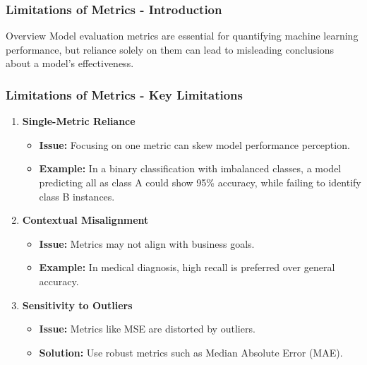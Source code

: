 \documentclass{beamer}
\begin{document}
\begin{frame}[fragile]
    \frametitle{Limitations of Metrics - Introduction}
    \begin{block}{Overview}
        Model evaluation metrics are essential for quantifying machine learning performance, but reliance solely on them can lead to misleading conclusions about a model's effectiveness.
    \end{block}
\end{frame}

\begin{frame}[fragile]
    \frametitle{Limitations of Metrics - Key Limitations}
    \begin{enumerate}
        \item \textbf{Single-Metric Reliance}
        \begin{itemize}
            \item \textbf{Issue:} Focusing on one metric can skew model performance perception.
            \item \textbf{Example:} In a binary classification with imbalanced classes, a model predicting all as class A could show 95\% accuracy, while failing to identify class B instances.
        \end{itemize}

        \item \textbf{Contextual Misalignment}
        \begin{itemize}
            \item \textbf{Issue:} Metrics may not align with business goals.
            \item \textbf{Example:} In medical diagnosis, high recall is preferred over general accuracy.
        \end{itemize}

        \item \textbf{Sensitivity to Outliers}
        \begin{itemize}
            \item \textbf{Issue:} Metrics like MSE are distorted by outliers.
            \item \textbf{Solution:} Use robust metrics such as Median Absolute Error (MAE).
        \end{itemize}
    \end{enumerate}
\end{frame}
\end{document}
